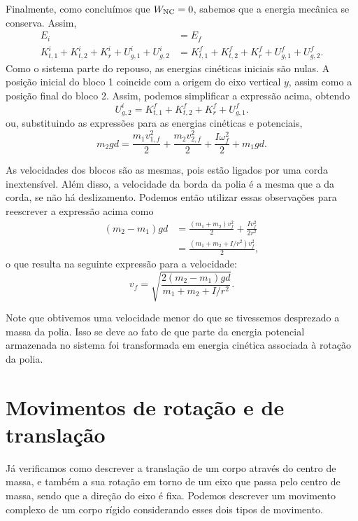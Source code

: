 Finalmente, como concluímos que $W_{\rm{NC}} = 0$, sabemos que a energia mecânica se conserva. Assim,
\begin{align}
    E_i &= E_f \\
    K_{t,1}^i + K_{t,2}^i + K_r^i + U_{g,1}^i + U_{g,2}^i &= K_{t,1}^f + K_{t,2}^f + K_r^f + U_{g,1}^f + U_{g,2}^f.
\end{align}
%
Como o sistema parte do repouso, as energias cinéticas iniciais são nulas. A posição inicial do bloco 1 coincide com a origem do eixo vertical $y$, assim como a posição final do bloco 2. Assim, podemos simplificar a expressão acima, obtendo
\begin{equation}
    U_{g,2}^i = K_{t,1}^f + K_{t,2}^f + K_r^f + U_{g,1}^f.
\end{equation}
%
ou, substituindo as expressões para as energias cinéticas e potenciais,
\begin{equation}
    m_2 g d = \frac{m_1 v_{1, f}^2}{2} + \frac{m_2 v_{2, f}^2}{2} + \frac{I\omega_f^2}{2} + m_1 g d.
\end{equation}

As velocidades dos blocos são as mesmas, pois estão ligados por uma corda inextensível. Além disso, a velocidade da borda da polia é a mesma que a da corda, se não há deslizamento. Podemos então utilizar essas observações para reescrever a expressão acima como
\begin{align}
    (m_2 - m_1) gd &= \frac{(m_1 + m_2) v_f^2}{2} + \frac{I v_f^2}{2r^2} \\
    &= \frac{(m_1 + m_2 + I/r^2) v_f^2}{2},
\end{align}
%
o que resulta na seguinte expressão para a velocidade:
\begin{equation}
    v_f = \sqrt{\frac{2(m_2-m_1)gd}{m_1 + m_2 + I/r^2}}.
\end{equation}

Note que obtivemos uma velocidade menor do que se tivessemos desprezado a massa da polia. Isso se deve ao fato de que parte da energia potencial armazenada no sistema foi transformada em energia cinética associada à rotação da polia.


\section{Movimentos de rotação e de translação}

Já verificamos como descrever a translação de um corpo através do centro de massa, e também a sua  rotação em torno de um eixo que passa pelo centro de massa, sendo que a direção do eixo é fixa. Podemos descrever um movimento complexo de um corpo rígido considerando esses dois tipos de movimento.

